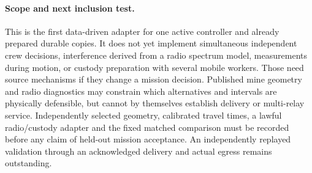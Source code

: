 \documentclass[11pt]{article}
\begin{document}
\paragraph{Scope and next inclusion test.}
This is the first data-driven adapter for one active controller and
already prepared durable copies. It does not yet implement simultaneous
independent crew decisions, interference derived from a radio spectrum
model, measurements during motion, or custody preparation with several
mobile workers. Those need source mechanisms if they change a mission
decision. Published mine geometry and radio diagnostics may constrain
which alternatives and intervals are physically defensible, but cannot
by themselves establish delivery or multi-relay service. Independently
selected geometry, calibrated travel times, a lawful radio/custody
adapter and the fixed matched comparison must be recorded before any
claim of held-out mission acceptance. An independently replayed validation
through an acknowledged delivery and actual egress remains outstanding.
\end{document}
